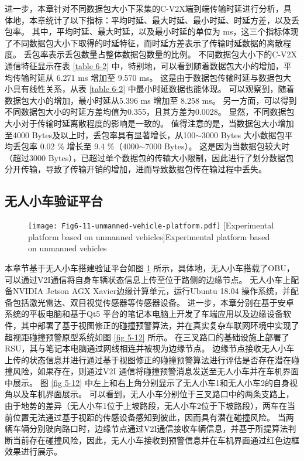 进一步，本章针对不同数据包大小下采集的C-V2X端到端传输时延进行分析，具体地，本章统计了以下指标：平均时延、最大时延、最小时延、时延方差，以及丢包率。
其中，平均时延、最大时延，以及最小时延的单位为 ms，这三个指标体现了不同数据包大小下取得的时延特征，而时延方差表示了传输时延数据的离散程度。
丢包率表示丢包数量占整体数据包数量的比例。
不同数据包大小下的C-V2X通信特征显示在表 \ref{table 6-2} 中，特别地，可以看到随着数据包大小的增加，平均传输时延从 6.271 ms 增加至 9.570 ms。
这是由于数据包传输时延与数据包大小具有线性关系，从表 \ref{table 6-2} 中最小时延数据也能体现。
可以观察到，随着数据包大小的增加，最小时延从5.396 ms 增加至 8.258 ms。
另一方面，可以得到不同数据包大小的时延方差均值为0.355，且其方差为0.0028。
显然，不同数据包大小对于传输时延离散程度的影响是一致的。
值得注意的是，当数据包大小增加至4000 Bytes及以上时，丢包率具有显著增长，从100$\sim$3000 Bytes 大小数据包平均丢包率 0.02 \% 增长至 9.4 \%（4000$\sim$7000 Bytes）。
这是因为当数据包较大时（超过3000 Bytes），已超过单个数据包的传输大小限制，因此进行了划分数据包分开传输，导致了传输开销的增加，进而导致数据包传在输过程中丢失。

\subsection{无人小车验证平台}

\begin{figure}[h]
\centering
  \texttt{[image: Fig6-11-unmanned-vehicle-platform.pdf]}
  [Experimental platform based on unmanned vehicles]{Experimental platform based on unmanned vehicles}
  \label{fig 5-11}
\end{figure}

本章节基于无人小车搭建验证平台如图 \ref{fig 5-11} 所示，具体地，无人小车搭载了OBU，可以通过V2I通信将自身车辆状态信息上传至位于路侧的边缘节点。
无人小车上配备NVIDIA Jetson AGX Xavier边缘计算单元，运行Ubuntu 18.04 操作系统，并配备包括激光雷达、双目视觉传感器等传感器设备。
进一步，本章分别在基于安卓系统的平板电脑和基于Qt5 平台的笔记本电脑上开发了车端应用以及边缘设备软件，其中部署了基于视图修正的碰撞预警算法，并在真实复杂车联网环境中实现了超视距碰撞预警原型系统如图 \ref{fig 5-12} 所示。
在三叉路口的基础设施上部署了RSU，其与笔记本电脑通过网线相连并被视为边缘节点。
边缘节点接收无人小车上传的状态信息并进行通过基于视图修正的碰撞预警算法进行评估是否存在潜在碰撞风险，如果存在，则通过V2I 通信将碰撞预警消息发送至无人小车并在车机界面中展示。
图 \ref{fig 5-12} 中左上和右上角分别显示了无人小车1和无人小车2的自身视角以及车机界面展示。
可以看到，无人小车分别位于三叉路口中的两条支路上，由于地势的差异（无人小车1位于上坡路段，无人小车2位于下坡路段），两车在当前位置无法通过基于视距的传感设备感知到彼此，因而具有潜在碰撞风险。
当两辆车辆分别驶向路口时，边缘节点通过V2I通信接收车辆信息，并基于所提算法判断当前存在碰撞风险，因此，无人小车接收到预警信息并在车机界面通过红色边框效果进行展示。

